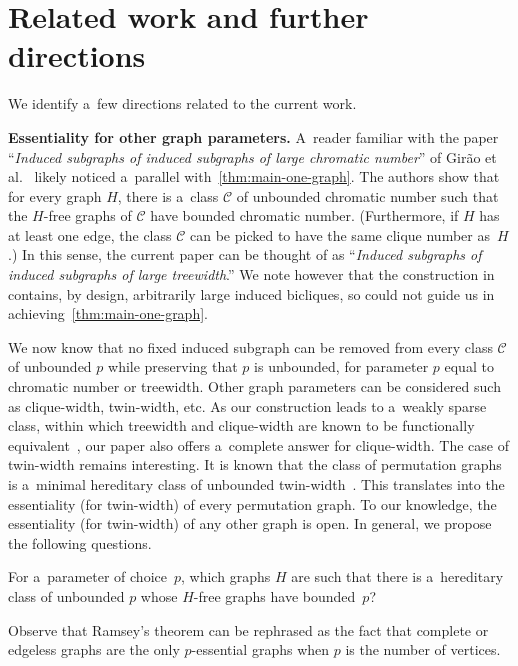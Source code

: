 \section{Related work and further directions}
We identify a~few directions related to the current work.

\medskip
\textbf{Essentiality for other graph parameters.}
A~reader familiar with the paper ``\emph{Induced subgraphs of induced subgraphs of large chromatic number}'' of Gir\~ao et al.~\cite{giraoetal} likely noticed a~parallel with~\cref{thm:main-one-graph}.
The authors show that for every graph $H$, there is a~class $\mathcal C$ of unbounded chromatic number such that the \mbox{$H$-free} graphs of $\mathcal C$ have bounded chromatic number. 
(Furthermore, if $H$ has at least one edge, the class $\mathcal C$ can be picked to have the same clique number as~$H$.)
In this sense, the current paper can be thought of as ``\emph{Induced subgraphs of induced subgraphs of large treewidth}.''
We note however that the construction in~\cite{giraoetal} contains, by design, arbitrarily large induced bicliques, so could not guide us in achieving~\cref{thm:main-one-graph}.

We now know that no fixed induced subgraph can be removed from every class $\mathcal C$ of unbounded $p$ while preserving that $p$ is unbounded, for parameter $p$ equal to chromatic number or treewidth.  
Other graph parameters can be considered such as clique-width, twin-width, etc.
As our construction leads to a~weakly sparse class, within which treewidth and clique-width are known to be functionally equivalent~\cite{Gurski00}, our paper also offers a~complete answer for clique-width.
The case of twin-width remains interesting.
It is known that the class of permutation graphs is a~minimal hereditary class of unbounded twin-width~\cite{twin-width1}.
This translates into the essentiality (for twin-width) of every permutation graph.
To our knowledge, the essentiality (for twin-width) of any other graph is open.  
In general, we propose the following questions.

\begin{meta-problem}
  For a~parameter of choice~$p$, which graphs $H$ are such that there is a~hereditary class of unbounded $p$ whose $H$-free graphs have bounded~$p$?
\end{meta-problem}

Observe that Ramsey's theorem can be rephrased as the fact that complete or edgeless graphs are the only $p$-essential graphs when $p$ is the number of vertices.

